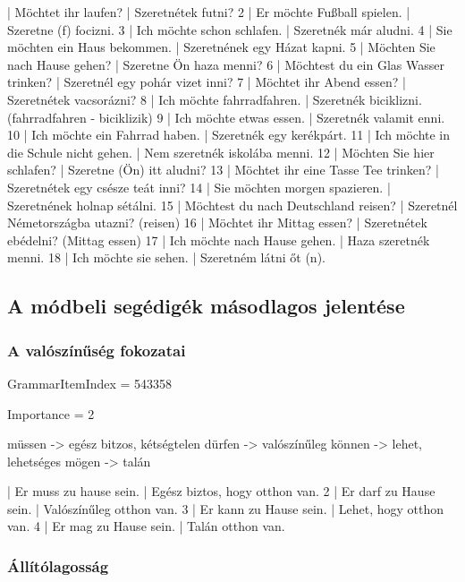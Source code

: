 \documentclass{article}
\newenvironment{desc}{\verbatim}{\endverbatim}
\newenvironment{exmp}{\verbatim}{\endverbatim}
\begin{document}
\begin{exmp}
1 | Möchtet ihr laufen? | Szeretnétek futni?
2 | Er möchte Fußball spielen. | Szeretne (f) focizni.
3 | Ich möchte schon schlafen. | Szeretnék már aludni.
4 | Sie möchten ein Haus bekommen. | Szeretnének egy Házat kapni.
5 | Möchten Sie nach Hause gehen? | Szeretne Ön haza menni?
6 | Möchtest du ein Glas Wasser trinken? | Szeretnél egy pohár vizet inni?
7 | Möchtet ihr Abend essen? | Szeretnétek vacsorázni?
8 | Ich möchte fahrradfahren. | Szeretnék biciklizni. (fahrradfahren - biciklizik)
9 | Ich möchte etwas essen. | Szeretnék valamit enni.
10 | Ich möchte ein Fahrrad haben. | Szeretnék egy kerékpárt.
11 | Ich möchte in die Schule nicht gehen. | Nem szeretnék iskolába menni.
12 | Möchten Sie hier schlafen? | Szeretne (Ön) itt aludni?
13 | Möchtet ihr eine Tasse Tee trinken? | Szeretnétek egy csésze teát inni?
14 | Sie möchten morgen spazieren. | Szeretnének holnap sétálni.
15 | Möchtest du nach Deutschland reisen? | Szeretnél Németországba utazni? (reisen)
16 | Möchtet ihr Mittag essen? | Szeretnétek ebédelni? (Mittag essen)
17 | Ich möchte nach Hause gehen. | Haza szeretnék menni.
18 | Ich möchte sie sehen. | Szeretném látni őt (n).
\end{exmp}

\subsection{A módbeli segédigék másodlagos jelentése}

\subsubsection{A valószínűség fokozatai}

GrammarItemIndex = 543358

Importance = 2

\begin{desc}
müssen -> egész bitzos, kétségtelen
dürfen -> valószínűleg
können -> lehet, lehetséges
mögen -> talán
\end{desc}

\begin{exmp}
1 | Er muss zu hause sein. | Egész biztos, hogy otthon van.
2 | Er darf zu Hause sein. | Valószínűleg otthon van.
3 | Er kann zu Hause sein. | Lehet, hogy otthon van.
4 | Er mag zu Hause sein. | Talán otthon van.
\end{exmp}

\subsubsection{Állítólagosság}
\end{document}
